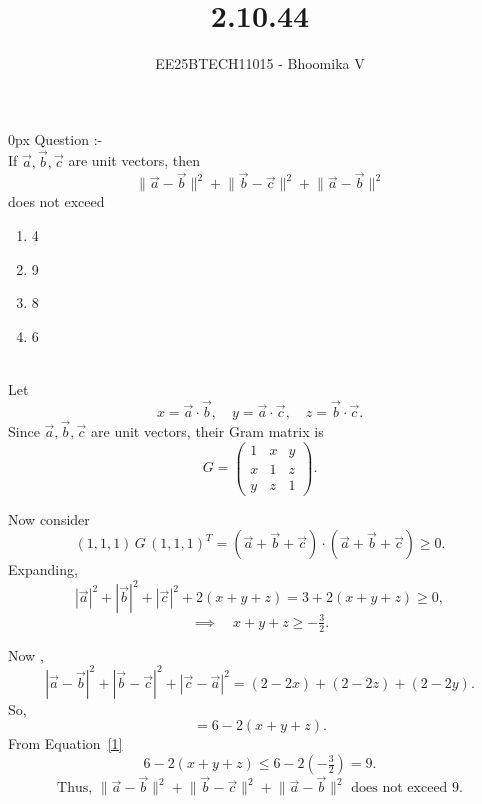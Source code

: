 \documentclass[journal]{IEEEtran}
\begin{document}

\vspace{3cm}

\title{2.10.44}
\author{EE25BTECH11015 - Bhoomika V}
{\let\newpage\relax\maketitle}

\renewcommand{\thefigure}{\theenumi}
\renewcommand{\thetable}{\theenumi}
\setlength{\intextsep}{10pt} %


\renewcommand{\thetable}{\theenumi}
\parindent 0px 
{Question :-} \\ 
If $\vec{a}, \vec{b}, \vec{c}$ are unit vectors, then
\[
\lVert \vec{a} - \vec{b} \rVert^2
+ \lVert \vec{b} - \vec{c} \rVert^2
+ \lVert \vec{a} - \vec{b} \rVert^2
\]
does not exceed
\begin{enumerate}[label=\alph*)] %
    \item 4
    \item 9
    \item 8
    \item 6
\end{enumerate}




\solution \\
Let 
\[
x = \vec{a}\cdot \vec{b}, \quad y = \vec{a}\cdot \vec{c}, \quad z = \vec{b}\cdot \vec{c}.
\]
Since $\vec{a},\vec{b},\vec{c}$ are unit vectors, their Gram matrix is
\[
G = \begin{pmatrix}
1 & x & y \\
x & 1 & z \\
y & z & 1
\end{pmatrix}.
\]

Now consider
\[
(1,1,1) \, G \, (1,1,1)^T = (\vec{a}+\vec{b}+\vec{c}) \cdot (\vec{a}+\vec{b}+\vec{c}) \geq 0.
\]
Expanding,
\[
|\vec{a}|^2 + |\vec{b}|^2 + |\vec{c}|^2 + 2(x+y+z) = 3 + 2(x+y+z) \geq 0,
\]
\begin{equation}
\implies \quad x+y+z \geq -\tfrac{3}{2}.
\label{1}
\end{equation}




Now ,
\[
|\vec{a}-\vec{b}|^2 + |\vec{b}-\vec{c}|^2 + |\vec{c}-\vec{a}|^2
= (2-2x) + (2-2z) + (2-2y).
\]
So,
\[
= 6 - 2(x+y+z).
\]
From Equation~\eqref{1}
\[
6 - 2(x+y+z) \leq 6 - 2\left(-\tfrac{3}{2}\right) = 9.
\]
\[
\text{Thus, } 
\lVert \vec{a} - \vec{b} \rVert^2
+ \lVert \vec{b} - \vec{c} \rVert^2
+ \lVert \vec{a} - \vec{b} \rVert^2
\text{ does not exceed } 9.
\]
\end{document}
